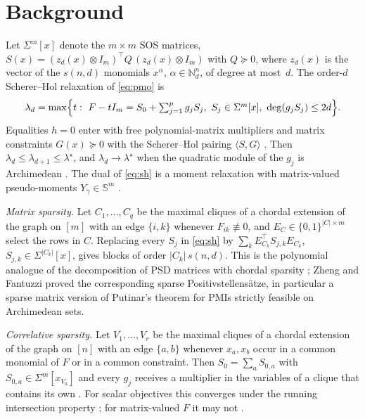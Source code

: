 \documentclass[smallextended]{svjour3}
\newcommand{\N}{\mathbb{N}}
\newcommand{\Sym}{\mathbb{S}}
\newcommand{\SOS}{\Sigma}
\newcommand{\sz}[2]{s(#1,#2)}
\begin{document}
\section{Background}
\label{sec:background}

Let $\SOS^m[x]$ denote the $m\times m$ SOS matrices,
$S(x)=(z_d(x)\otimes I_m)^\top Q\,(z_d(x)\otimes I_m)$ with $Q\succeq 0$,
where $z_d(x)$ is the vector of the $\sz{n}{d}$ monomials $x^\alpha$,
$\alpha\in\N^n_d$, of degree at most~$d$. The order-$d$ Scherer--Hol
relaxation of \eqref{eq:pmo} is
\begin{equation}
\label{eq:sh}
\lambda_d=\max\Bigl\{t:\ F-tI_m=S_0+\textstyle\sum_{j=1}^p g_jS_j,\
S_j\in\SOS^m[x],\ \deg(g_jS_j)\le 2d\Bigr\}.
\end{equation}
Equalities $h=0$ enter with free polynomial-matrix multipliers and matrix
constraints $G(x)\succeq0$ with the Scherer--Hol pairing $\langle S,G\rangle$
\cite{SchererHol2006}. Then $\lambda_d\le\lambda_{d+1}\le\lambda^\star$,
and $\lambda_d\to\lambda^\star$ when the quadratic module of the $g_j$ is
Archimedean \cite{SchererHol2006,Kojima2003,HenrionLasserre2006}. The dual
of \eqref{eq:sh} is a moment relaxation with matrix-valued pseudo-moments
$Y_\gamma\in\Sym^m$ \cite{HenrionLasserre2006}.

\emph{Matrix sparsity.} Let $C_1,\dots,C_q$ be the maximal cliques of a
chordal extension of the graph on $[m]$ with an edge $\{i,k\}$ whenever
$F_{ik}\not\equiv0$, and $E_C\in\{0,1\}^{|C|\times m}$ select the rows in
$C$. Replacing every $S_j$ in \eqref{eq:sh} by
$\sum_k E_{C_k}^\top S_{j,k}E_{C_k}$, $S_{j,k}\in\SOS^{|C_k|}[x]$, gives
blocks of order $|C_k|\,\sz{n}{d}$. This is the polynomial analogue of the
decomposition of PSD matrices with chordal sparsity
\cite{VandenbergheAndersen2015};
Zheng and Fantuzzi \cite{ZhengFantuzzi2023} proved the corresponding
sparse Positivstellens\"atze, in particular a sparse matrix version of
Putinar's theorem for PMIs strictly feasible on Archimedean sets.

\emph{Correlative sparsity.} Let $V_1,\dots,V_r$ be the maximal cliques of
a chordal extension of the graph on $[n]$ with an edge $\{a,b\}$ whenever
$x_a,x_b$ occur in a common monomial of $F$ or in a common constraint.
Then $S_0=\sum_aS_{0,a}$ with $S_{0,a}\in\SOS^m[x_{V_a}]$ and every $g_j$
receives a multiplier in the variables of a clique that contains its own
\cite{Waki2006,Lasserre2006,KojimaMuramatsu2009}. For scalar objectives this
converges under the running intersection property \cite{Lasserre2006}; for
matrix-valued $F$ it may not \cite[Ex.~5.1]{MillerWangGuo2026}.
\end{document}
